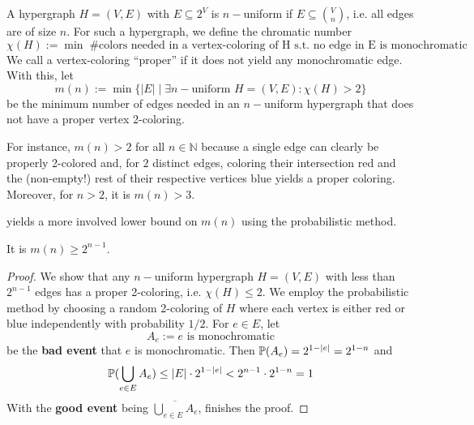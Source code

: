 \documentclass[../main.tex]{subfiles}
\begin{document}
\begin{example}[Hypergraphs]
	A hypergraph $H = (V,E)$ with $E \subseteq 2^V$ is $n-$uniform if $E \subseteq \binom{V}{n}$, i.e. all edges are of size $n$. For such a hypergraph, we define the chromatic number
	$$\chi(H) := \min \; \#\text{colors needed in a vertex-coloring of H s.t. no edge in E is monochromatic}$$
	We call a vertex-coloring \enquote{proper} if it does not yield any monochromatic edge. With this, let
	$$m(n) := \min\{|E| \mid \exists n-\text{uniform } H=(V,E): \chi(H) > 2\}$$
	be the minimum number of edges needed in an $n-$uniform hypergraph that does not have a proper vertex 2-coloring. 
	
	For instance, $m(n) > 2$ for all $n \in \mathbb{N}$ because a single edge can clearly be properly 2-colored and, for $2$ distinct edges, coloring their intersection red and the (non-empty!) rest of their respective vertices blue yields a proper coloring. Moreover, for $n > 2$, it is $m(n) > 3$.
	
	 yields a more involved lower bound on $m(n)$ using the probabilistic method.
\end{example}

\begin{proposition}\label{prop:chromaticProb}
	It is $m(n) \geq 2^{n-1}$.
\end{proposition}

\begin{proof}
We show that any $n-$uniform hypergraph $H = (V,E)$ with less than $2^{n-1}$ edges has a proper 2-coloring, i.e. $\chi(H) \leq 2$. We employ the probabilistic method by choosing a random 2-coloring of $H$ where each vertex is either red or blue independently with probability $1/2$. For $e \in E$, let 
$$A_e := e \text{ is monochromatic}$$ be the \textbf{bad event} that $e$ is monochromatic. Then $\mathbb{P}(A_e) = 2^{1-|e|} = 2^{1-n}$ and $$\mathbb{P}(\bigcup_{e \in E} A_e) \leq |E| \cdot 2^{1-|e|} < 2^{n-1} \cdot 2^{1-n} = 1$$ With the \textbf{good event} being $\overline{\bigcup_{e \in E} A_e}$,  finishes the proof.
\end{proof}

		
\end{document}
